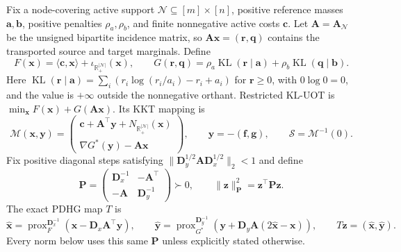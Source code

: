 \documentclass[11pt]{article}
\theoremstyle{remark}
\newcommand{\R}{\mathbb R}
\newcommand{\KL}{\operatorname{KL}}
\newcommand{\prox}{\operatorname{prox}}
\newcommand{\np}[1]{\lVert#1\rVert_{\mathbf P}}
\begin{document}
Fix a node-covering active support $\mathcal N\subseteq[m]\times[n]$, positive reference masses $\mathbf a,\mathbf b$, positive penalties $\rho_a,\rho_b$, and finite nonnegative active costs $\mathbf c$.
Let $\mathbf A=\mathbf A_{\mathcal N}$ be the unsigned bipartite incidence matrix, so $\mathbf A\mathbf x=(\mathbf r,\mathbf q)$ contains the transported source and target marginals.
Define
\begin{equation}
F(\mathbf x)=\langle\mathbf c,\mathbf x\rangle+\iota_{\R_+^{|\mathcal N|}}(\mathbf x),\qquad G(\mathbf r,\mathbf q)=\rho_a\KL(\mathbf r\mid\mathbf a)+\rho_b\KL(\mathbf q\mid\mathbf b).
\end{equation}
Here $\KL(\mathbf r\mid\mathbf a)=\sum_i(r_i\log(r_i/a_i)-r_i+a_i)$ for $\mathbf r\geq0$, with $0\log0=0$, and the value is $+\infty$ outside the nonnegative orthant.
Restricted KL-UOT is $\min_{\mathbf x}F(\mathbf x)+G(\mathbf A\mathbf x)$.
Its KKT mapping is
\begin{equation}
\mathcal M(\mathbf x,\mathbf y)=\begin{pmatrix}\mathbf c+\mathbf A^\top\mathbf y+N_{\R_+^{|\mathcal N|}}(\mathbf x)\\ \nabla G^*(\mathbf y)-\mathbf A\mathbf x\end{pmatrix},\qquad \mathbf y=-(\mathbf f,\mathbf g),\qquad \mathcal S=\mathcal M^{-1}(0).
\label{eq:kkt}
\end{equation}
Fix positive diagonal steps satisfying $\|\mathbf D_y^{1/2}\mathbf A\mathbf D_x^{1/2}\|_2<1$ and define
\begin{equation}
\mathbf P=\begin{pmatrix}\mathbf D_x^{-1}&-\mathbf A^\top\\-\mathbf A&\mathbf D_y^{-1}\end{pmatrix}\succ0,\qquad \np{\mathbf z}^2=\mathbf z^\top\mathbf P\mathbf z.
\label{eq:metric}
\end{equation}
The exact PDHG map $T$ is
\begin{equation}
\widehat{\mathbf x}=\prox_F^{\mathbf D_x^{-1}}(\mathbf x-\mathbf D_x\mathbf A^\top\mathbf y),\qquad \widehat{\mathbf y}=\prox_{G^*}^{\mathbf D_y^{-1}}(\mathbf y+\mathbf D_y\mathbf A(2\widehat{\mathbf x}-\mathbf x)),\qquad T\mathbf z=(\widehat{\mathbf x},\widehat{\mathbf y}).
\label{eq:map}
\end{equation}
Every norm below uses this same $\mathbf P$ unless explicitly stated otherwise.
\end{document}
